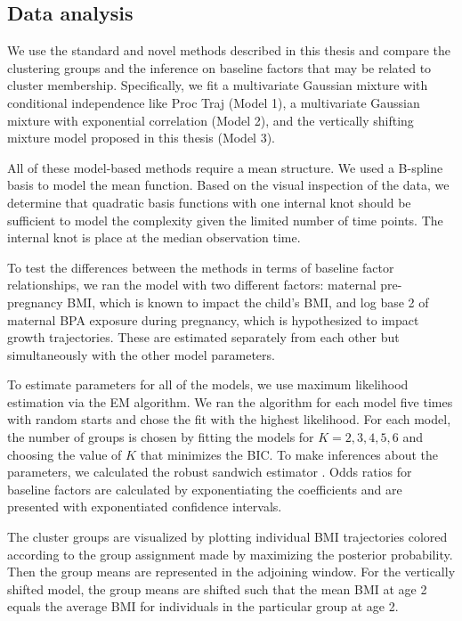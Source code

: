 \subsection{Data analysis}
We use the standard and novel methods described in this thesis and compare the clustering groups and the inference on baseline factors that may be related to cluster membership. Specifically, we fit a multivariate Gaussian mixture with conditional independence like Proc Traj (Model 1), a multivariate Gaussian mixture with exponential correlation (Model 2), and the vertically shifting mixture model proposed in this thesis (Model 3).

All of these model-based methods require a mean structure. We used a B-spline basis to model the mean function. Based on the visual inspection of the data, we determine that quadratic basis functions with one internal knot should be sufficient to model the complexity given the limited number of time points.  The internal knot is place at the median observation time. 

To test the differences between the methods in terms of baseline factor relationships, we ran the model with two different factors: maternal pre-pregnancy BMI, which is known to impact the child's BMI, and log base 2 of maternal BPA exposure during pregnancy, which is hypothesized to impact growth trajectories. These are estimated separately from each other but simultaneously with the other model parameters.

To estimate parameters for all of the models, we use maximum likelihood estimation via the EM algorithm. We ran the algorithm for each model five times with random starts and chose the fit with the highest likelihood. For each model, the number of groups is chosen by fitting the models for $K=2,3,4,5,6$ and choosing the value of $K$ that minimizes the BIC. To make inferences about the parameters, we calculated the robust sandwich estimator \cite{white1982}. Odds ratios for baseline factors are calculated by exponentiating the coefficients and are presented with exponentiated confidence intervals.

The cluster groups are visualized by plotting individual BMI trajectories colored according to the group assignment made by maximizing the posterior probability. Then the group means are represented in the adjoining window. For the vertically shifted model, the group means are shifted such that the mean BMI at age 2 equals the average BMI for individuals in the particular group at age 2. 


